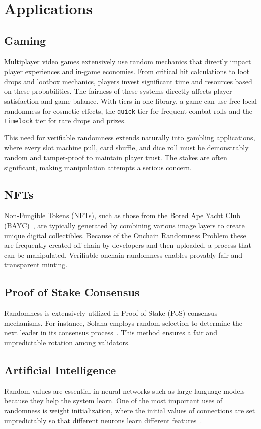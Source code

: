 \section{Applications}\label{sec:applications}

\subsection{Gaming}\label{sec:applications_gaming}
Multiplayer video games extensively use random mechanics that directly impact player experiences and in-game economies. From critical hit calculations to loot drops and lootbox mechanics, players invest significant time and resources based on these probabilities. The fairness of these systems directly affects player satisfaction and game balance. With tiers in one library, a game can use free local randomness for cosmetic effects, the \texttt{quick} tier for frequent combat rolls and the \texttt{timelock} tier for rare drops and prizes.

This need for verifiable randomness extends naturally into gambling applications, where every slot machine pull, card shuffle, and dice roll must be demonstrably random and tamper-proof to maintain player trust. The stakes are often significant, making manipulation attempts a serious concern.

\subsection{NFTs}\label{sec:applications_nfts}
Non-Fungible Tokens (NFTs), such as those from the Bored Ape Yacht Club (BAYC)~\cite{boredapeyachtclub}, are typically generated by combining various image layers to create unique digital collectibles. Because of the Onchain Randomness Problem these are frequently created off-chain by developers and then uploaded, a process that can be manipulated. Verifiable onchain randomness enables provably fair and transparent minting.

\subsection{Proof of Stake Consensus}\label{sec:applications_defi}
Randomness is extensively utilized in Proof of Stake (PoS) consensus mechanisms. For instance, Solana employs random selection to determine the next leader in its consensus process~\cite{yakovenko2025solana}. This method ensures a fair and unpredictable rotation among validators.

\subsection{Artificial Intelligence}\label{sec:applications_security}
Random values are essential in neural networks such as large language models because they help the system learn. One of the most important uses of randomness is weight initialization, where the initial values of connections are set unpredictably so that different neurons learn different features~\cite{glorot2010understanding}.
